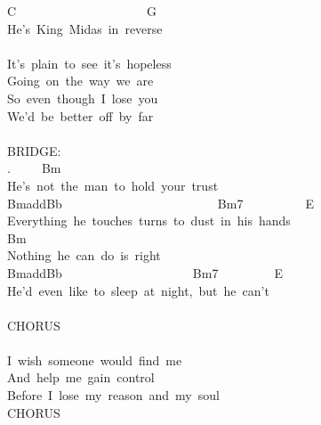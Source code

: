 {C\ \ \ \ \ \ \ \ \ \ \ \ \ \ \ \ \ \ \ \ \ G\\
He's\ King\ Midas\ in\ reverse\\
\\
It's\ plain\ to\ see\ it's\ hopeless\\
Going\ on\ the\ way\ we\ are\\
So\ even\ though\ I\ lose\ you\\
We'd\ be\ better\ off\ by\ far\\
\\
BRIDGE:\\
.\ \ \ \ \ Bm\\
He's\ not\ the\ man\ to\ hold\ your\ trust\\
BmaddBb\ \ \ \ \ \ \ \ \ \ \ \ \ \ \ \ \ \ \ \ \ \ \ \ \ Bm7\ \ \ \ \ \ \ \ \ \ E\\
Everything\ he\ touches\ turns\ to\ dust\ in\ his\ hands\\
Bm\\
Nothing\ he\ can\ do\ is\ right\\
BmaddBb\ \ \ \ \ \ \ \ \ \ \ \ \ \ \ \ \ \ \ \ \ Bm7\ \ \ \ \ \ \ \ \ E\\
He'd\ even\ like\ to\ sleep\ at\ night,\ but\ he\ can't\\
\\
CHORUS\\
\\
I\ wish\ someone\ would\ find\ me\\
And\ help\ me\ gain\ control\\
Before\ I\ lose\ my\ reason\ and\ my\ soul\\
CHORUS}


